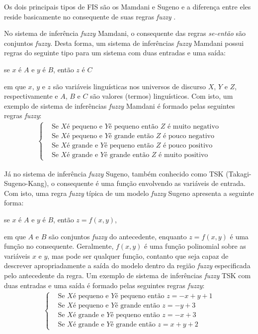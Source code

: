 Os dois principais tipos de FIS são os Mamdani e Sugeno e a diferença entre eles reside basicamente no consequente de suas regras \textit{fuzzy} \cite[p.~74]{Jang1997}.

No sistema de inferência \textit{fuzzy} Mamdani, o consequente das regras \textit{se-então} são conjuntos \textit{fuzzy}. Desta forma, um sistema de inferências \textit{fuzzy} Mamdani possui regras do seguinte tipo para um sistema com duas entradas e uma saída:
\begin{center}
se $x$ é $A$ e $y$ é $B$, então $z$ é $C$
\end{center}
em que $x$, $y$ e $z$ são variáveis linguísticas nos universos de discurso $X$, $Y$ e $Z$, respectivamente e $A$, $B$ e $C$ são valores (termos) linguísticos. Com isto, um exemplo de sistema de inferências \textit{fuzzy} Mamdani é formado pelas seguintes regras \textit{fuzzy}:
\begin{align*}
\begin{cases}
&\mbox{Se }X  \mbox{é pequeno e } Y \mbox{é pequeno então } Z \mbox{ é muito negativo} \\
&\mbox{Se }X  \mbox{é pequeno e } Y \mbox{é grande então } Z \mbox{ é pouco negativo} \\
&\mbox{Se }X  \mbox{é grande e } Y \mbox{é pequeno então } Z \mbox{ é pouco positivo} \\
&\mbox{Se }X  \mbox{é grande e } Y \mbox{é grande então } Z \mbox{ é muito positivo} 
\end{cases}
\end{align*}

Já no sistema de inferência \textit{fuzzy} Sugeno, também conhecido como TSK (Takagi-Sugeno-Kang), o consequente é uma função envolvendo as variáveis de entrada. Com isto, uma regra \textit{fuzzy} típica de um modelo \textit{fuzzy} Sugeno apresenta a seguinte forma:
\begin{center}
se $x$ é $A$ e $y$ é $B$, então $z = f(x,y)$,
\end{center}
em que $A$ e $B$ são conjuntos \textit{fuzzy} do antecedente, enquanto $z = f(x,y)$ é uma função no consequente. Geralmente, $f(x,y)$ é uma função polinomial sobre as variáveis $x$ e $y$, mas pode ser qualquer função, contanto que seja capaz de descrever apropriadamente a saída do modelo dentro da região \textit{fuzzy} especificada pelo antecedente da regra. Um exemplo de sistema de inferências \textit{fuzzy} TSK com duas entradas e uma saída é formado pelas seguintes regras \textit{fuzzy}:
\begin{align*}
\begin{cases}
&\mbox{Se }X  \mbox{é pequeno e } Y \mbox{é pequeno então } z=-x+y+1 \\
&\mbox{Se }X  \mbox{é pequeno e } Y \mbox{é grande então } z=-y+3  \\
&\mbox{Se }X  \mbox{é grande e } Y \mbox{é pequeno então } z=-x+3  \\
&\mbox{Se }X  \mbox{é grande e } Y \mbox{é grande então } z=x+y+2  
\end{cases}
\end{align*}

